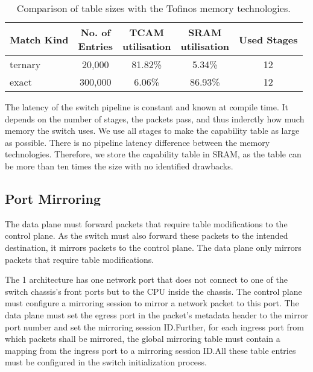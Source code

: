 \begin{table}
  \centering
  \begin{tabular}{lcccc}
    \toprule
    Match Kind & \makecell{No. of\\ Entries} & \makecell{TCAM\\ utilisation} & \makecell{SRAM\\ utilisation} & Used Stages\\
    \midrule
    ternary & 20,000 & 81.82\% & 5.34\% & 12\\
    exact & 300,000 & 6.06\%& 86.93\% & 12\\
    \bottomrule
\end{tabular}
\vspace{1em}
\caption{\label{tab:mem-type} Comparison of table sizes with the Tofinos memory technologies.}
\end{table}

The latency of the switch pipeline is constant and known at compile time. It depends on the number of stages, the packets pass, and thus inderctly how much memory the switch uses. We use all stages to make the capability table as large as possible. There is no pipeline latency difference between the memory technologies. Therefore, we store the capability table in \ac{SRAM}, as the table can be more than ten times the size with no identified drawbacks.

\subsection{Port Mirroring}
The data plane must forward packets that require table modifications to the control plane. As the switch must also forward these packets to the intended destination, it mirrors packets to the control plane. The data plane only mirrors packets that require table modifications.

The \tofino{} 1 architecture has one network port that does not connect to one of the switch chassis's front ports but to the \ac{CPU} inside the chassis. The control plane must configure a mirroring session to mirror a network packet to this port. The data plane must set the egress port in the packet's metadata header to the mirror port number and set the mirroring session ID.\@ Further, for each ingress port from which packets shall be mirrored, the global mirroring table must contain a mapping from the ingress port to a mirroring session ID.\@ All these table entries must be configured in the switch initialization process.

